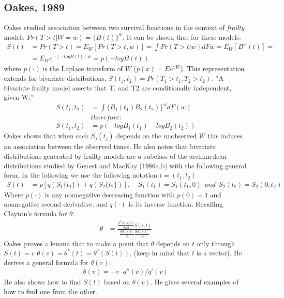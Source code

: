 \documentclass[]{article}
\begin{document}
 \subsection{Oakes, 1989 \cite{oakes1989bivariate}}
 Oakes studied association between two survival functions in the context of \emph{frailty} models $Pr(T>t|W=w) = \{B(t)\}^w$. It can be shown that for these models:
	$$
	\begin{aligned}
		S(t) &= Pr(T>t) = E_W[Pr(T>t,w)] = \int Pr(T>t|w)dF{w} = E_W[B^w(t)] = \\
		  &=E_W e^{-(-logB(t))w} = p(-logB(t))
	\end{aligned}
	$$
 where $p(\cdot)$ is the Laplace transform of $W$ ($p(x) = Ee^{xW}$). This representation extends for bivariate distributions, $S(t_1, t_2) = Pr(T_1>t_1, T_2>t_2)$. ''A bivariate frailty model asserts that T, and T2 are conditionally independent, given W:''
	$$
	\begin{aligned}
		S(t_1, t_2) &= \int \{B_1(t_1)B_2(t_2)\}^w dF(w)\\
		& therefore:\\
		S(t_1, t_2) &= p(-logB_1(t_1)-logB_2(t_2))
	\end{aligned}
	$$
	Oakes shows that when each $S_j(t_j)$ depends on the unobserved $W$ this induces an association between the observed times. He also notes that bivariate distributions generated by frailty models are a subclass of the archimedean distributions studied by Genest and MacKay (1986a,b) with the following general form. In the following we use the following notation $t=(t_1, t_2)$\\
	$$
	\begin{aligned}
		S(t) &= p[q(S_1\{t_1\}) + q(S_2\{t_2\})],~~~~~S_1(t_1) = S_1(t_1, 0)~~and~~S_2(t_2) = S_2(0, t_2)
	\end{aligned}
	$$
Where $p(\cdot)$ is any nonnegative decreasing function with $p(0)=1$ and nonnegative second derivative, and $q(\cdot)$ is its inverse function. Recalling Clayton's formula for $\theta$:
	$$
	\begin{aligned}
		\theta &= \frac{ \frac{\partial^2 S(s,t)}{\partial s \partial t} S(s, t)}    {\frac{\partial S(s, t)}{\partial t} \frac{\partial S(s, t)}{\partial s}}
	\end{aligned}
	$$
Oakes proves a lemma that to make a point that $\theta$ depends on $t$ only through $S(t)=v$ $\theta(v) = \theta^*(t) = \theta^*(S(t))$, (keep in mind that $t$ is a vector). He derives a general formula for $\theta(v)$:
	$$
	\begin{aligned}
		\theta(v) = -v\cdot q''(v)/q'(v)
	\end{aligned}
	$$
He also shows how to find $S(t)$ based on $\theta(v)$. He gives several examples of how to find one from the other.
\end{document}
